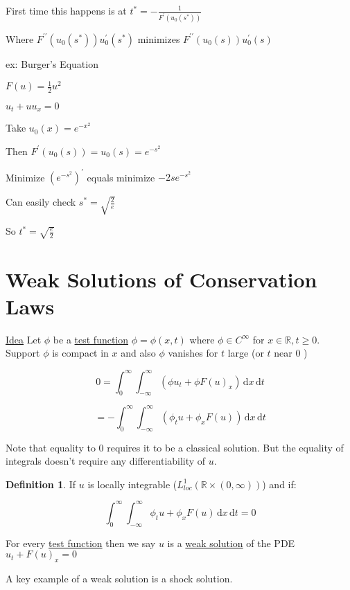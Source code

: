 \documentclass{article}
\theoremstyle{definition}
\newtheorem{definition}{Definition}
\begin{document}
First time this happens is at \(t^{\ast}=-\frac{1}{F^{\prime} (u_0(s^{\ast}))}\)

Where \(F^{\prime\prime} (u_0(s^{\ast}))u_0^{\prime} (s^{\ast})\) minimizes \(F^{\prime\prime}(u_0(s))u_0^{\prime} (s)\)

ex: Burger's Equation

\(F(u)=\frac{1}{2}u^2\)

\(u_t + u u_x = 0\) 

Take \(u_0(x)=e^{-x^2}\) 

Then \(F^{\prime} (u_0(s))=u_0(s)=e^{-s^2}\)

Minimize \((e^{-s^2})^{\prime}\) equals minimize \(-2s e^{-s^2}\)  

Can easily check \(s^{\ast} = \sqrt{\frac{2}{e}}\)

So \(t^{\ast} = \sqrt{\frac{e}{2}} \) 

\section*{Weak Solutions of Conservation Laws}

\underline{Idea} Let \(\phi\) be a \underline{test function} \(\phi = \phi (x,t)\) where \(\phi\in C^{\infty}\) for \(x\in\mathbb{R} , t \geq 0\). Support \(\phi\) is compact in \(x\) and also \(\phi\) vanishes for \(t\) large (or \(t\) near \(0\) )      

\[
    0 = \int_{0}^{\infty} \int_{-\infty}^{\infty} \left( \phi u_t + \phi F(u)_x \right)  \,\mathrm{d}x  \,\mathrm{d}t 
\]

\[
    = - \int_{0}^{\infty} \int_{-\infty}^{\infty} \left( \phi_t u + \phi_x F(u) \right)  \,\mathrm{d}x  \,\mathrm{d}t 
\]

Note that equality to \(0\) requires it to be a classical solution. But the equality of integrals doesn't require any differentiability of \(u\).

\begin{definition}
    If \(u\) is locally integrable (\(L^1_{loc}(\mathbb{R} \times (0,\infty))\)) and if:

    \[
        \int_{0}^{\infty} \int_{-\infty}^{\infty} \phi_t u + \phi _x F(u) \,\mathrm{d}x  \,\mathrm{d}t = 0
    \]

    For every \underline{test function} then we say \(u\) is a \underline{weak solution} of the PDE \(u_t + F(u)_x = 0\) 
\end{definition}

A key example of a weak solution is a shock solution.
\end{document}
